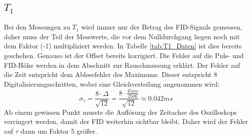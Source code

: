 \documentclass[12pt,a4paper]{article}
\begin{document}
\subsection{$T_1$}
Bei den Messungen zu $T_1$ wird immer nur der Betrag des FID-Signals gemessen, daher muss der Teil der Messwerte, die vor dem Nulldurchgang liegen noch mit dem Faktor (-1) multipliziert werden. In Tabelle \ref{tab:T1_Daten} ist dies bereits geschehen. Genauso ist der Offset bereits korrigiert. Die Fehler auf die Puls- und FID-Höhe werden in dem Abschnitt zur Rauschmessung erklärt. Der Fehler auf die Zeit entspricht dem Ablesefehler des Maximums. Dieser entspricht 8 Digitalisierungsschritten, wobei eine Gleichverteilung angenommen wird:
\begin{equation*}
\sigma _{\tau} = \dfrac{8 \cdot \Delta}{\sqrt{12}} = \dfrac{8 \cdot \frac{45 ms}{2500}}{\sqrt{12}} \approx 0.042 ms
\end{equation*}
Ab einem gewissen Punkt musste die Auflösung der Zeitachse des Oszilloskops verringert werden, damit der FID weiterhin sichtbar bleibt. Daher wird der Fehler auf $\tau$ dann um Faktor 5 größer.
\end{document}
